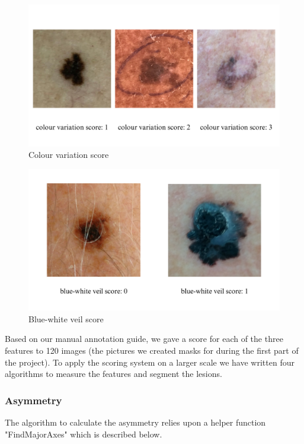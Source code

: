 \begin{figure}[H]
    \centering
    \includegraphics[width=1\linewidth]{colour variation.png}
    \caption{Colour variation score}
    \label{fig:Colour variation score}
\end{figure}

\begin{figure}[H]
    \centering
    \includegraphics[width=1\linewidth]{blue-white veill.png}
    \caption{Blue-white veil score}
    \label{fig:Blue-white veil score}
\end{figure}

\noindent Based on our manual annotation guide, we gave a score for each of the three features to 120 images (the pictures we created masks for during the first part of the project).
\newline
To apply the scoring system on a larger scale we have written four algorithms to measure the features and segment the lesions.

\subsubsection{Asymmetry}
The algorithm to calculate the asymmetry relies upon a helper function
"FindMajorAxes" which is described below.

